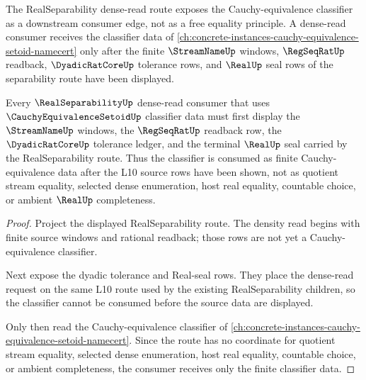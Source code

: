 The RealSeparability dense-read route exposes the Cauchy-equivalence classifier as a downstream consumer edge, not as a free equality principle. A dense-read consumer receives the classifier data of \autoref{ch:concrete-instances-cauchy-equivalence-setoid-namecert} only after the finite $\StreamNameUp$ windows, $\RegSeqRatUp$ readback, $\DyadicRatCoreUp$ tolerance rows, and $\RealUp$ seal rows of the separability route have been displayed.

\begin{theorem}
\label{thm:real-separability-cauchy-equivalence-dense-read-route}
Every $\RealSeparabilityUp$ dense-read consumer that uses $\CauchyEquivalenceSetoidUp$ classifier data must first display the $\StreamNameUp$ windows, the $\RegSeqRatUp$ readback row, the $\DyadicRatCoreUp$ tolerance ledger, and the terminal $\RealUp$ seal carried by the RealSeparability route. Thus the classifier is consumed as finite Cauchy-equivalence data after the L10 source rows have been shown, not as quotient stream equality, selected dense enumeration, host real equality, countable choice, or ambient $\RealUp$ completeness.
\end{theorem}
\begin{proof}
Project the displayed RealSeparability route. The density read begins with finite source windows and rational readback; those rows are not yet a Cauchy-equivalence classifier.

Next expose the dyadic tolerance and Real-seal rows. They place the dense-read request on the same L10 route used by the existing RealSeparability children, so the classifier cannot be consumed before the source data are displayed.

Only then read the Cauchy-equivalence classifier of \autoref{ch:concrete-instances-cauchy-equivalence-setoid-namecert}. Since the route has no coordinate for quotient stream equality, selected dense enumeration, host real equality, countable choice, or ambient completeness, the consumer receives only the finite classifier data.
\end{proof}
